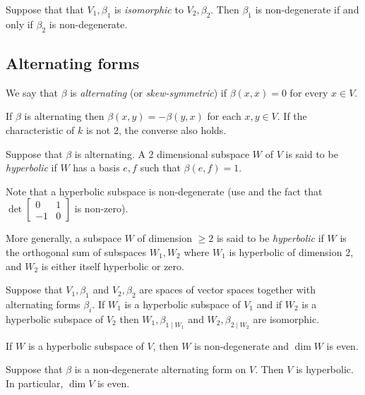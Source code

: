 \documentclass[11pt]{article}
\numberwithin{equation}{section}
\begin{document}
\begin{lemma}
Suppose that that \(V_1,\beta_1\) is \emph{isomorphic} to \(V_2,\beta_2\).
Then \(\beta_1\) is non-degenerate if and only if \(\beta_2\) is
non-degenerate.
\label{lemma:isomorphism-preserves-nondegen}
\end{lemma}
\subsection{Alternating forms}
\label{sec:alternating-forms}
We say that \(\beta\) is \emph{alternating} (or \emph{skew-symmetric}) if
\(\beta(x,x) = 0\) for every \(x \in V\).

\begin{lemma}
If \(\beta\) is alternating then \(\beta(x,y) = -\beta(y,x)\) for each
\(x,y \in V\). If the characteristic of \(k\) is not 2, the converse
also holds.
\label{lemma:alt-skew}
\end{lemma}

Suppose that \(\beta\) is alternating.
A 2 dimensional subspace \(W\) of \(V\) is said to be \emph{hyperbolic} if \(W\) has a basis
\(e,f\) such that \(\beta(e,f) = 1\).

Note that a hyperbolic subspace is non-degenerate (use
 and the fact that \(\det \begin{bmatrix}
0 & 1 \\ -1 & 0 \end{bmatrix}\) is non-zero).

More generally, a subspace \(W\) of dimension \(\ge 2\) is said to be
\emph{hyperbolic} if \(W\) is the orthogonal sum of subspaces \(W_1,W_2\)
where \(W_1\) is hyperbolic of dimension 2, and \(W_2\) is either
itself hyperbolic or zero.

\begin{lemma}
Suppose that \(V_1,\beta_1\) and \(V_2,\beta_2\) are spaces of vector
spaces together with alternating forms \(\beta_i\). If \(W_1\) is a
hyperbolic subspace of \(V_1\) and if \(W_2\) is a hyperbolic subspace
of \(V_2\) then \(W_1,\beta_{1\mid W_1}\) and \(W_2,\beta_{2\mid W_2}\)
are isomorphic.
\label{lemma:hyperbolic-equiv}
\end{lemma}

\begin{lemma}
If \(W\) is a hyperbolic subspace of \(V\), then \(W\) is
non-degenerate and \(\dim W\) is even.
\label{lemma:hyperbolic-even-dimensional}
\end{lemma}

\begin{theorem}
Suppose that \(\beta\) is a non-degenerate alternating form on
\(V\). Then \(V\) is hyperbolic. In particular, \(\dim V\) is even. 
\label{theorem:alternating-forms-are-hyperbolic}
\end{theorem}
\end{document}
